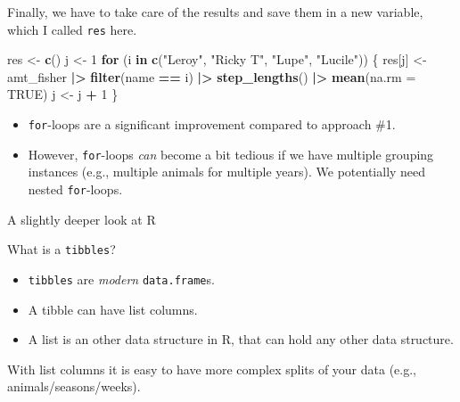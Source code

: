 \documentclass[ignorenonframetext,,t]{beamer}
\let\oldtextbf\textbf
\renewcommand{\textbf}[1]{\textcolor{spamwell}{\oldtextbf{#1}}}
\providecommand{\tightlist}{%
\setlength{\itemsep}{0pt}\setlength{\parskip}{0pt}}
\newenvironment{Shaded}{\begin{snugshade}}{\end{snugshade}}
\newcommand{\AttributeTok}[1]{\textcolor[rgb]{0.13,0.29,0.53}{#1}}
\newcommand{\ConstantTok}[1]{\textcolor[rgb]{0.56,0.35,0.01}{#1}}
\newcommand{\ControlFlowTok}[1]{\textcolor[rgb]{0.13,0.29,0.53}{\textbf{#1}}}
\newcommand{\DecValTok}[1]{\textcolor[rgb]{0.00,0.00,0.81}{#1}}
\newcommand{\FunctionTok}[1]{\textcolor[rgb]{0.13,0.29,0.53}{\textbf{#1}}}
\newcommand{\NormalTok}[1]{#1}
\newcommand{\OtherTok}[1]{\textcolor[rgb]{0.56,0.35,0.01}{#1}}
\newcommand{\SpecialCharTok}[1]{\textcolor[rgb]{0.81,0.36,0.00}{\textbf{#1}}}
\newcommand{\StringTok}[1]{\textcolor[rgb]{0.31,0.60,0.02}{#1}}
\providecommand{\tightlist}{%
\setlength{\itemsep}{0pt}\setlength{\parskip}{0pt}}
\renewcommand{\tightlist}{\setlength{\itemsep}{1.4ex}\setlength{\parskip}{0pt}}
\begin{document}
\begin{frame}[fragile]
Finally, we have to take care of the results and save them in a new
variable, which I called \texttt{res} here.

\begin{Shaded}
\begin{Highlighting}[]
\NormalTok{res }\OtherTok{\textless{}{-}} \FunctionTok{c}\NormalTok{()}
\NormalTok{j }\OtherTok{\textless{}{-}} \DecValTok{1}
\ControlFlowTok{for}\NormalTok{ (i }\ControlFlowTok{in} \FunctionTok{c}\NormalTok{(}\StringTok{"Leroy"}\NormalTok{, }\StringTok{"Ricky T"}\NormalTok{, }\StringTok{"Lupe"}\NormalTok{, }\StringTok{"Lucile"}\NormalTok{)) \{}
\NormalTok{  res[j] }\OtherTok{\textless{}{-}}\NormalTok{ amt\_fisher }\SpecialCharTok{|\textgreater{}} \FunctionTok{filter}\NormalTok{(name }\SpecialCharTok{==}\NormalTok{ i) }\SpecialCharTok{|\textgreater{}} 
    \FunctionTok{step\_lengths}\NormalTok{() }\SpecialCharTok{|\textgreater{}} \FunctionTok{mean}\NormalTok{(}\AttributeTok{na.rm =} \ConstantTok{TRUE}\NormalTok{)}
\NormalTok{  j }\OtherTok{\textless{}{-}}\NormalTok{ j }\SpecialCharTok{+} \DecValTok{1}
\NormalTok{\}}
\end{Highlighting}
\end{Shaded}
\end{frame}

\begin{frame}[fragile]
\begin{itemize}
\tightlist
\item
  \texttt{for}-loops are a significant improvement compared to approach
  \#1.
\item
  However, \texttt{for}-loops \emph{can} become a bit tedious if we have
  multiple grouping instances (e.g., multiple animals for multiple
  years). We potentially need nested \texttt{for}-loops.
\end{itemize}
\end{frame}

\begin{frame}[fragile]{A slightly deeper look at R}
\protect\hypertarget{a-slightly-deeper-look-at-r}{}
\begin{block}{What is a \texttt{tibbles}?}
\protect\hypertarget{what-is-a-tibbles}{}
\begin{itemize}
\tightlist
\item
  \texttt{tibbles} are \emph{modern} \texttt{data.frame}s.
\item
  A tibble can have list columns.
\item
  A list is an other data structure in R, that can hold any other data
  structure.
\end{itemize}

With list columns it is easy to have more complex splits of your data
(e.g., animals/seasons/weeks).
\end{block}
\end{frame}
\end{document}
